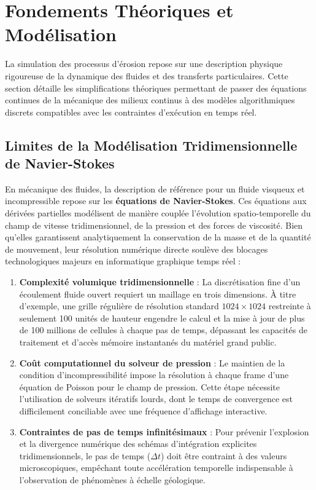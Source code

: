 \documentclass[10pt,twocolumn,a4paper]{article}
\begin{document}
\section{Fondements Théoriques et Modélisation}\label{sec:theorie}

La simulation des processus d'érosion repose sur une description physique rigoureuse de la dynamique des fluides et des transferts particulaires. Cette section détaille les simplifications théoriques permettant de passer des équations continues de la mécanique des milieux continus à des modèles algorithmiques discrets compatibles avec les contraintes d'exécution en temps réel.

\subsection{Limites de la Modélisation Tridimensionnelle de Navier-Stokes}\label{subsec:navier_stokes}
En mécanique des fluides, la description de référence pour un fluide visqueux et incompressible repose sur les \textbf{équations de Navier-Stokes}. Ces équations aux dérivées partielles modélisent de manière couplée l'évolution spatio-temporelle du champ de vitesse tridimensionnel, de la pression et des forces de viscosité. Bien qu'elles garantissent analytiquement la conservation de la masse et de la quantité de mouvement, leur résolution numérique directe soulève des blocages technologiques majeurs en informatique graphique temps réel :

\begin{enumerate}
    \item \textbf{Complexité volumique tridimensionnelle} : La discrétisation fine d'un écoulement fluide ouvert requiert un maillage en trois dimensions. À titre d'exemple, une grille régulière de résolution standard $1024 \times 1024$ restreinte à seulement 100 unités de hauteur engendre le calcul et la mise à jour de plus de 100 millions de cellules à chaque pas de temps, dépassant les capacités de traitement et d'accès mémoire instantanés du matériel grand public.
    \item \textbf{Coût computationnel du solveur de pression} : Le maintien de la condition d'incompressibilité impose la résolution à chaque frame d'une équation de Poisson pour le champ de pression. Cette étape nécessite l'utilisation de solveurs itératifs lourds, dont le temps de convergence est difficilement conciliable avec une fréquence d'affichage interactive.
    \item \textbf{Contraintes de pas de temps infinitésimaux} : Pour prévenir l'explosion et la divergence numérique des schémas d'intégration explicites tridimensionnels, le pas de temps ($\Delta t$) doit être contraint à des valeurs microscopiques, empêchant toute accélération temporelle indispensable à l'observation de phénomènes à échelle géologique.
\end{enumerate}
\end{document}
